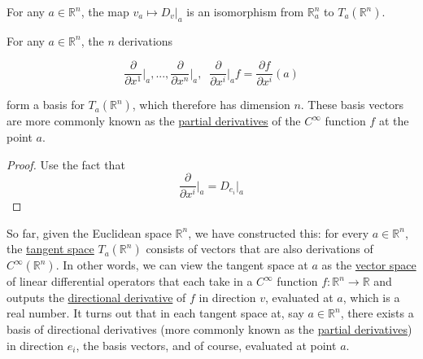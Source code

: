 \documentclass{article}
\newcounter{theorem}[section]
\begin{document}
    \begin{theorem}
      \label{thm:tangent-vectors-as-directional-derivatives}
      For any $a \in \mathbb{R}^n$, the map $v_a \mapsto D_v |_a$ is an isomorphism from $\mathbb{R}_a^n$ to $T_a (\mathbb{R}^n)$. 
    \end{theorem}

    \begin{corollary}
      \label{thm:coordinate-basis-of-the-tangent-space-to-rn}
      For any $a \in \mathbb{R}^n$, the $n$ derivations 

        \begin{equation}
          \frac{\partial}{\partial x^1} \bigg|_a, ..., \frac{\partial}{\partial x^n} \bigg|_a, \;\; \frac{\partial}{\partial x^i} \bigg|_a f = \frac{\partial f}{\partial x^i} (a)
        \end{equation}

      form a basis for $T_a (\mathbb{R}^n)$, which therefore has dimension $n$. These basis vectors are more commonly known as the \hyperref[mv-def:partial-derivative]{partial derivatives} of the $C^\infty$ function $f$ at the point $a$. 
    \end{corollary}
    \begin{proof}
      Use the fact that 
        \begin{equation}
          \frac{\partial}{\partial x^i} \bigg|_a = D_{e_i} \big|_a
        \end{equation}
    \end{proof}

    So far, given the Euclidean space $\mathbb{R}^n$, we have constructed this: for every $a \in \mathbb{R}^n$, the \hyperref[mv-def:tangent-space]{tangent space} $T_a (\mathbb{R}^n)$ consists of vectors that are also derivations of $C^\infty (\mathbb{R}^n)$. In other words, we can view the tangent space at $a$ as the \hyperref[lin-def:vector-space]{vector space} of linear differential operators that each take in a $C^\infty$ function $f: \mathbb{R}^n \to \mathbb{R}$ and outputs the \hyperref[mv-def:directional-derivative]{directional derivative} of $f$ in direction $v$, evaluated at $a$, which is a real number. It turns out that in each tangent space at, say $a \in \mathbb{R}^n$, there exists a basis of directional derivatives (more commonly known as the \hyperref[mv-def:partial-derivative]{partial derivatives}) in direction $e_i$, the basis vectors, and of course, evaluated at point $a$. 
\end{document}
